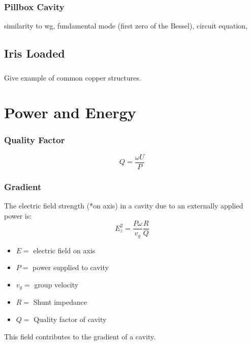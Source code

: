 \documentclass[professionalfonts,t]{beamer}
\begin{document}
\begin{frame}
	\frametitle{Pillbox Cavity}
	similarity to wg, fundamental mode (first zero of the Bessel), 
	circuit equation, 
\end{frame}


\subsection{Iris Loaded}
\begin{frame}
	\frametitle{}
	Give example of common copper structures. 
\end{frame}




\section{Power and Energy }
\begin{frame}
	\frametitle{Quality Factor}
	\begin{equation}
		Q= \frac{\omega U}{P}
	\end{equation}
\end{frame}

\begin{frame}
	\frametitle{Gradient}
	The electric field strength (*on axis) in a cavity 
	due to an externally applied power is:
	\begin{equation}
		E^2_z = \frac{P\omega}{v_g} \frac{R}{Q}
	\end{equation}
	\begin{itemize}
		\item $E =$ electric field on axis
		\item $P =$ power supplied to cavity
		\item $v_g =$ group velocity
		\item $R =$ Shunt impedance 
		\item $Q =$ Quality factor of cavity
	\end{itemize}

\vspace{0.5em}
This field contributes to the gradient of a cavity.
\end{frame}
\end{document}
